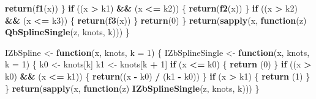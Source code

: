 \documentclass[
  12pt,
]{article}
\newenvironment{Shaded}{\begin{snugshade}}{\end{snugshade}}
\newcommand{\ControlFlowTok}[1]{\textcolor[rgb]{0.13,0.29,0.53}{\textbf{#1}}}
\newcommand{\DataTypeTok}[1]{\textcolor[rgb]{0.13,0.29,0.53}{#1}}
\newcommand{\DecValTok}[1]{\textcolor[rgb]{0.00,0.00,0.81}{#1}}
\newcommand{\KeywordTok}[1]{\textcolor[rgb]{0.13,0.29,0.53}{\textbf{#1}}}
\newcommand{\NormalTok}[1]{#1}
\newcommand{\OperatorTok}[1]{\textcolor[rgb]{0.81,0.36,0.00}{\textbf{#1}}}
\newcommand{\StringTok}[1]{\textcolor[rgb]{0.31,0.60,0.02}{#1}}
\begin{document}
\begin{Shaded}
\begin{Highlighting}[]
      \KeywordTok{return}\NormalTok{(}\KeywordTok{f1}\NormalTok{(x))}
\NormalTok{    \}}
    \ControlFlowTok{if}\NormalTok{ ((x }\OperatorTok{\textgreater{}}\StringTok{ }\NormalTok{k1) }\OperatorTok{\&\&}\StringTok{ }\NormalTok{(x }\OperatorTok{\textless{}=}\StringTok{ }\NormalTok{k2)) \{}
      \KeywordTok{return}\NormalTok{(}\KeywordTok{f2}\NormalTok{(x))}
\NormalTok{    \}}
    \ControlFlowTok{if}\NormalTok{ ((x }\OperatorTok{\textgreater{}}\StringTok{ }\NormalTok{k2) }\OperatorTok{\&\&}\StringTok{ }\NormalTok{(x }\OperatorTok{\textless{}=}\StringTok{ }\NormalTok{k3)) \{}
      \KeywordTok{return}\NormalTok{(}\KeywordTok{f3}\NormalTok{(x))}
\NormalTok{    \}}
    \KeywordTok{return}\NormalTok{(}\DecValTok{0}\NormalTok{)}
\NormalTok{  \}}
  \KeywordTok{return}\NormalTok{(}\KeywordTok{sapply}\NormalTok{(x, }\ControlFlowTok{function}\NormalTok{(z)}
    \KeywordTok{QbSplineSingle}\NormalTok{(z, knots, k)))}
\NormalTok{\}}

\NormalTok{IZbSpline \textless{}{-}}\StringTok{ }\ControlFlowTok{function}\NormalTok{(x, knots, }\DataTypeTok{k =} \DecValTok{1}\NormalTok{) \{}
\NormalTok{  IZbSplineSingle \textless{}{-}}\StringTok{ }\ControlFlowTok{function}\NormalTok{(x, knots, }\DataTypeTok{k =} \DecValTok{1}\NormalTok{) \{}
\NormalTok{    k0 \textless{}{-}}\StringTok{ }\NormalTok{knots[k]}
\NormalTok{    k1 \textless{}{-}}\StringTok{ }\NormalTok{knots[k }\OperatorTok{+}\StringTok{ }\DecValTok{1}\NormalTok{]}
    \ControlFlowTok{if}\NormalTok{ (x }\OperatorTok{\textless{}=}\StringTok{ }\NormalTok{k0) \{}
      \KeywordTok{return}\NormalTok{ (}\DecValTok{0}\NormalTok{)}
\NormalTok{    \}}
    \ControlFlowTok{if}\NormalTok{ ((x }\OperatorTok{\textgreater{}}\StringTok{ }\NormalTok{k0) }\OperatorTok{\&\&}\StringTok{ }\NormalTok{(x }\OperatorTok{\textless{}=}\StringTok{ }\NormalTok{k1)) \{}
      \KeywordTok{return}\NormalTok{((x }\OperatorTok{{-}}\StringTok{ }\NormalTok{k0) }\OperatorTok{/}\StringTok{ }\NormalTok{(k1 }\OperatorTok{{-}}\StringTok{ }\NormalTok{k0))}
\NormalTok{    \}}
    \ControlFlowTok{if}\NormalTok{ (x }\OperatorTok{\textgreater{}}\StringTok{ }\NormalTok{k1) \{}
      \KeywordTok{return}\NormalTok{ (}\DecValTok{1}\NormalTok{)}
\NormalTok{    \}}
\NormalTok{  \}}
  \KeywordTok{return}\NormalTok{(}\KeywordTok{sapply}\NormalTok{(x, }\ControlFlowTok{function}\NormalTok{(z)}
    \KeywordTok{IZbSplineSingle}\NormalTok{(z, knots, k)))}
\NormalTok{\}}


\end{Highlighting}
\end{Shaded}
\end{document}
